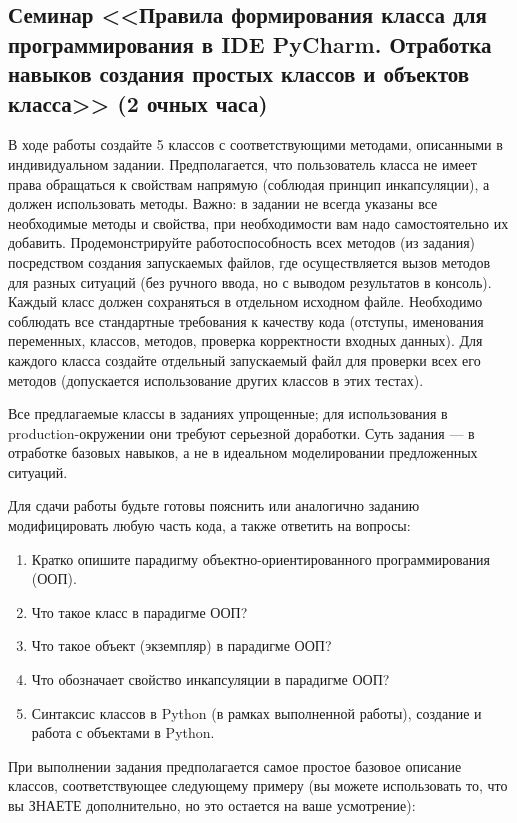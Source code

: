 \subsection{Семинар <<Правила формирования класса для программирования в IDE PyCharm. Отработка навыков создания простых классов и объектов класса>> 
(2 очных часа)}

В ходе работы создайте 5 классов с соответствующими методами, описанными в индивидуальном задании. 
Предполагается, что пользователь класса не имеет права обращаться к свойствам напрямую 
(соблюдая принцип инкапсуляции), а должен использовать методы. Важно: в задании не всегда указаны 
все необходимые методы и свойства, при необходимости вам надо самостоятельно их добавить.
Продемонстрируйте работоспособность всех методов (из задания) посредством создания запускаемых файлов, где осуществляется вызов методов для разных ситуаций (без ручного ввода, но с выводом результатов в консоль). 
Каждый класс должен сохраняться в отдельном исходном файле. Необходимо соблюдать все стандартные требования к качеству кода (отступы, именования переменных, классов, методов, проверка корректности входных данных).
Для каждого класса создайте отдельный запускаемый файл для проверки всех его методов 
(допускается использование других классов в этих тестах).

Все предлагаемые классы в заданиях упрощенные; для использования в production-окружении они требуют серьезной доработки. Суть задания — в отработке базовых навыков, а не в идеальном моделировании предложенных ситуаций.

Для сдачи работы будьте готовы пояснить или аналогично заданию модифицировать любую часть кода, а также ответить на вопросы:
\begin{enumerate}
    \item Кратко опишите парадигму объектно-ориентированного программирования (ООП).
    \item Что такое класс в парадигме ООП?
    \item Что такое объект (экземпляр) в парадигме ООП?
    \item Что обозначает свойство инкапсуляции в парадигме ООП?
    \item Синтаксис классов в Python (в рамках выполненной работы), создание и работа с объектами в Python.
\end{enumerate}

При выполнении задания предполагается самое простое базовое описание классов, соответствующее следующему 
примеру (вы можете использовать то, что вы ЗНАЕТЕ дополнительно, но это остается на ваше усмотрение):

